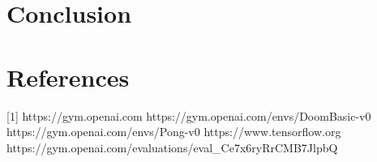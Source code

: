 \documentclass[12pt]{article}
\theoremstyle{plain}
\theoremstyle{definition}
\theoremstyle{remark}
\theoremstyle{plain}
\begin{document}
\section{Conclusion}

\section{References}
[1] https://gym.openai.com \newline
[2] https://gym.openai.com/envs/DoomBasic-v0 \newline
[3] https://gym.openai.com/envs/Pong-v0 \newline
[4] https://www.tensorflow.org \newline
[5] https://gym.openai.com/evaluations/eval\_Ce7x6ryRrCMB7JlpbQ \newline
\end{document}
